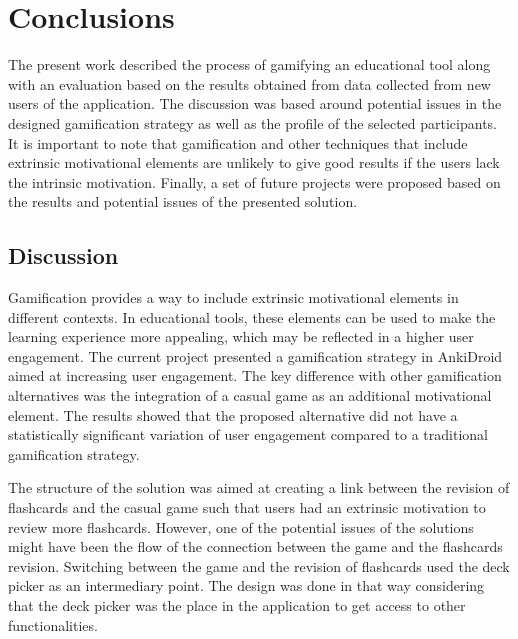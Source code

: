 
\chapter{Conclusions} %

\label{conc} %


The present work described the process of gamifying an educational tool along with an evaluation based on the results obtained from data collected from new users of the application. The discussion was based around potential issues in the designed gamification strategy as well as the profile of the selected participants. It is important to note that gamification and other techniques that include extrinsic motivational elements are unlikely to give good results if the users lack the intrinsic motivation. Finally, a set of future projects were proposed based on the results and potential issues of the presented solution.

\section{Discussion}
Gamification provides a way to include extrinsic motivational elements in different contexts. In educational tools, these elements can be used to make the learning experience more appealing, which may be reflected in a higher user engagement. The current project presented a gamification strategy in AnkiDroid aimed at increasing user engagement. The key difference with other gamification alternatives was the integration of a casual game as an additional motivational element. The results showed that the proposed alternative did not have a statistically significant variation of user engagement compared to a traditional gamification strategy.

The structure of the solution was aimed at creating a link between the revision of flashcards and the casual game such that users had an extrinsic motivation to review more flashcards. However, one of the potential issues of the solutions might have been the flow of the connection between the game and the flashcards revision. Switching between the game and the revision of flashcards used the deck picker as an intermediary point. The design was done in that way considering that the deck picker was the place in the application to get access to other functionalities.

